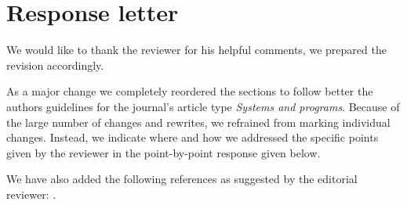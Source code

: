 \documentclass{memoir}
\begin{document}
\section*{Response letter}


We would like to thank the reviewer for his helpful comments, we prepared the revision accordingly.

As a major change we completely reordered the sections to follow better the authors guidelines 
 for the journal's article type \emph{Systems and programs}.
Because of the large number of changes and rewrites, we refrained from marking individual changes. 
Instead, we indicate where and how we addressed the specific points given by the reviewer in the 
  point-by-point response given below.
  
We have also added the following references as suggested by the editorial reviewer:
\citep{dang_validation_2013,roura_marga:_2014,delibasis_novel_2013,hodneland_automated_2012,ji_generalized_2012}.
\end{document}
